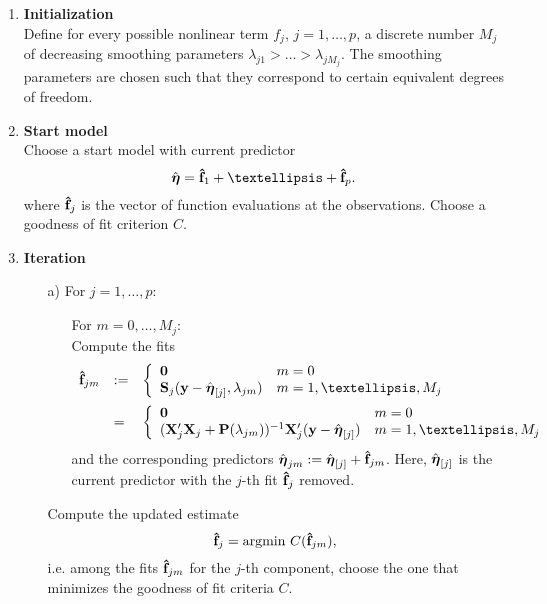 \documentclass[11pt,a4paper,twoside]{bayesxarticle}
\begin{document}
\begin{enumerate}
\item {\bf Initialization} \\
Define for every possible nonlinear term $f_j$, $j=1,\dots,p$, a
discrete number $M_j$ of decreasing smoothing parameters
$\lambda_{j1} > \ldots >\lambda_{jM_j}$. The smoothing parameters
are chosen such that they correspond to certain equivalent degrees
of freedom.
\item {\bf Start model} \\
Choose a start model with current predictor
$$
\hat{\etavec} = \fhatvec_1 + \ldots + \fhatvec_p.
$$
where $\mathbf{\hat{f}}_j$ is the vector of function evaluations at the
observations. Choose a goodness of fit criterion $C$.

\item {\bf Iteration}
\begin{itemize}
\item[a)] For $j=1,\dots,p$:
\begin{enumerate}
\item[]
For $m=0,\dots,M_j$: \\
Compute the fits
$$
\begin{array}{lll}
\fhatvec_{jm} & := &
\left\{
\begin{array}{ll}
\nullvec & m=0 \\
\Smat_j(\yvec-\hat{\etavec}_{[j]},\lambda_{jm})  & m=1,\dots,M_j \\
\end{array}
\right. \\[0.4cm]
& = &
\left\{
\begin{array}{ll}
\nullvec & m=0 \\
(\Xvec_j'\Xvec_j + \Pvec(\lambda_{jm}))^{-1} \Xvec_j' (\yvec-\hat{\etavec}_{[j]})  & m=1,\dots,M_j \\
\end{array}
\right. \\
\end{array}
$$
and the corresponding predictors $\hat{\boldsymbol{\eta}}_{jm} :=
\hat{\boldsymbol{\eta}}_{[j]}+\mathbf{\hat{f}}_{jm}$. Here,  $\hat{\boldsymbol{\eta}}_{[j]}$ is
the current predictor with the $j$-th fit  $\mathbf{\hat{f}}_j$  removed.
\end{enumerate}

Compute the updated estimate
$$
\mathbf{\hat{f}}_j = \mbox{argmin} \, \,  C(\mathbf{\hat{f}}_{jm}),
$$
i.e. among the fits $\mathbf{\hat{f}}_{jm}$ for the $j$-th component, choose the one that minimizes
the goodness of fit criteria $C$.


\end{itemize}
\end{enumerate}
\end{document}
